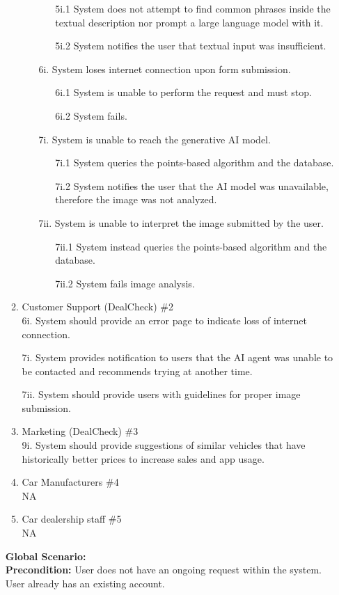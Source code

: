 \documentclass[]{article}
\begin{document}
\begin{enumerate}[{\bf {BE}1.}]
\begin{enumerate}[{\bf VP1.}]
\begin{enumerate}
    		\begin{enumerate}
    			\item [5i.1] System does not attempt to find common phrases inside the textual description nor prompt a large language model with it.
    			\item [5i.2] System notifies the user that textual input was insufficient.
    		\end{enumerate}
    		\item [6i.] System loses internet connection upon form submission.
    		\begin{enumerate}
    			\item [6i.1] System is unable to perform the request and must stop.
    			\item [6i.2] System fails.
    		\end{enumerate}
    		\item [7i.] System is unable to reach the generative AI model.
    		\begin{enumerate}
    			\item [7i.1] System queries the points-based algorithm and the database.
    			\item [7i.2] System notifies the user that the AI model was unavailable, therefore the image was not analyzed.
    		\end{enumerate}
    		\item [7ii.] System is unable to interpret the image submitted by the user.
    		\begin{enumerate}
    			\item [7ii.1] System instead queries the points-based algorithm and the database.
    			\item [7ii.2] System fails image analysis.
    		\end{enumerate}
            \end{enumerate}
		
		\item Customer Support (DealCheck) \#2 \\
			6i. System should provide an error page to indicate loss of internet connection.

			7i. System provides notification to users that the AI agent was unable to be contacted and recommends trying at another time.
			
			7ii. System should provide users with guidelines for proper image submission.
		\item Marketing (DealCheck) \#3 \\
			9i. System should provide suggestions of similar vehicles that have historically better prices to increase sales and app usage.
		\item Car Manufacturers \#4 \\
			NA
		\item Car dealership staff \#5 \\
			NA
	\end{enumerate}
	{\bf Global Scenario:}\\
	{\bf Precondition:} User does not have an ongoing request within the system. User already has an existing account. 


\end{enumerate}
\end{document}
